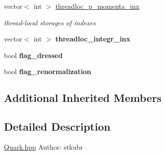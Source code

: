 \begin{DoxyCompactItemize}
\item 
\hypertarget{class_c___quark_a16276524396db70cf500004e4732b62e}{vector$<$ int $>$ \hyperlink{class_c___quark_a16276524396db70cf500004e4732b62e}{threadloc\-\_\-p\-\_\-momenta\-\_\-inx}}\label{class_c___quark_a16276524396db70cf500004e4732b62e}

\begin{DoxyCompactList}\small\item\em thread-\/local storages of indexes \end{DoxyCompactList}\item 
\hypertarget{class_c___quark_a96dfb638401816915fc1728cb4587f2a}{vector$<$ int $>$ {\bfseries threadloc\-\_\-integr\-\_\-inx}}\label{class_c___quark_a96dfb638401816915fc1728cb4587f2a}

\item 
\hypertarget{class_c___quark_a88da2d4e54ff2d0194691e9ebf0313cc}{bool {\bfseries flag\-\_\-dressed}}\label{class_c___quark_a88da2d4e54ff2d0194691e9ebf0313cc}

\item 
\hypertarget{class_c___quark_ab74616977c12b63b1bb3937656b2a580}{bool {\bfseries flag\-\_\-renormalization}}\label{class_c___quark_ab74616977c12b63b1bb3937656b2a580}

\end{DoxyCompactItemize}
\subsection*{Additional Inherited Members}


\subsection{Detailed Description}
\hyperlink{_quark_8hpp_source}{Quark.\-hpp} Author\-: stkubr 

